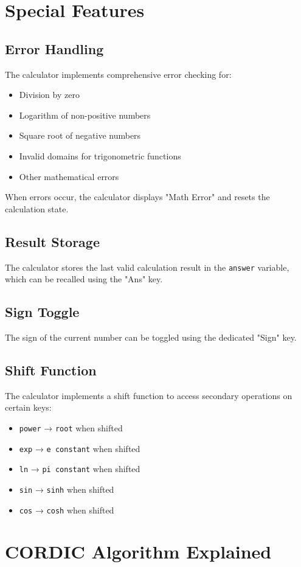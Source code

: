 \documentclass[12pt]{article}
\begin{document}
\section{Special Features}
\subsection{Error Handling}
The calculator implements comprehensive error checking for:
\begin{itemize}
\item Division by zero
\item Logarithm of non-positive numbers
\item Square root of negative numbers
\item Invalid domains for trigonometric functions
\item Other mathematical errors
\end{itemize}
When errors occur, the calculator displays "Math Error" and resets the calculation state.
\subsection{Result Storage}
The calculator stores the last valid calculation result in the \texttt{answer} variable, which can be recalled using the "Ans" key.
\subsection{Sign Toggle}
The sign of the current number can be toggled using the dedicated "Sign" key.
\subsection{Shift Function}
The calculator implements a shift function to access secondary operations on certain keys:
\begin{itemize}
\item \texttt{power} → \texttt{root} when shifted
\item \texttt{exp} → \texttt{e constant} when shifted
\item \texttt{ln} → \texttt{pi constant} when shifted
\item \texttt{sin} → \texttt{sinh} when shifted
\item \texttt{cos} → \texttt{cosh} when shifted
\end{itemize}
\section{CORDIC Algorithm Explained} \label{cordic}
\end{document}
